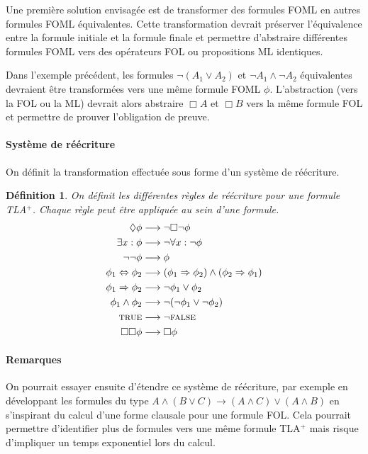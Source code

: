 \documentclass[12pt]{article}
\newcommand{\TRUE}{\textsc{true}}
\newcommand{\FALSE}{\textsc{false}}
\newtheorem{defin}{Définition}
\begin{document}
Une première solution envisagée est de transformer des formules FOML en autres formules FOML équivalentes.
Cette transformation devrait préserver l'équivalence entre la formule initiale et la formule finale et permettre d'abstraire différentes formules FOML vers des opérateurs FOL ou propositions ML identiques.

Dans l'exemple précédent, les formules $\neg (A_1 \lor A_2)$ et $\neg A_1 \land \neg A_2$ équivalentes devraient être transformées vers une même formule FOML $\phi$.
L'abstraction (vers la FOL ou la ML) devrait alors abstraire $\Box A$ et $\Box B$ vers la même formule FOL et permettre de prouver l'obligation de preuve.


\paragraph{Système de réécriture}

On définit la transformation effectuée sous forme d'un système de réécriture.

\begin{defin}
  On définit les différentes règles de réécriture pour une formule TLA$^+$.
  Chaque règle peut être appliquée au sein d'une formule.
  \begin{align*}
    \Diamond \phi & \longrightarrow \neg \Box \neg \phi \\
    \exists x : \phi & \longrightarrow \neg \forall x : \neg \phi \\
    \neg \neg \phi & \longrightarrow \phi \\
    \phi_1 \Leftrightarrow \phi_2 & \longrightarrow (\phi_1 \Rightarrow \phi_2) \land (\phi_2 \Rightarrow \phi_1) \\
    \phi_1 \Rightarrow \phi_2 & \longrightarrow \neg \phi_1 \lor \phi_2 \\
    \phi_1 \land \phi_2 & \longrightarrow \neg(\neg \phi_1 \lor \neg \phi_2) \\
    \TRUE & \longrightarrow \neg \FALSE \\
    \Box \Box \phi & \longrightarrow \Box \phi \\
  \end{align*}
\end{defin}

\paragraph{Remarques}

On pourrait essayer ensuite d'étendre ce système de réécriture, par exemple en développant les formules du type $A \land (B \lor C) \longrightarrow (A \land C) \lor (A \land B)$ en s'inspirant du calcul d'une forme clausale pour une formule FOL.
Cela pourrait permettre d'identifier plus de formules vers une même formule TLA$^+$ mais risque d'impliquer un temps exponentiel lors du calcul.
\end{document}
